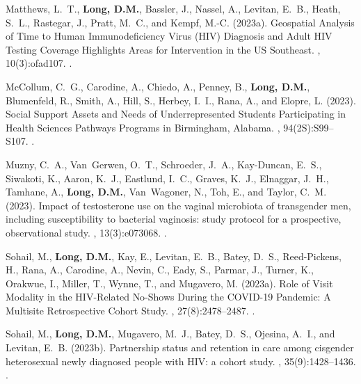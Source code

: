 \begin{thebibliography}{}
Matthews, L.~T., \textbf{Long, D.M.}, Bassler, J., Nassel, A., Levitan, E.~B., Heath,
  S.~L., Rastegar, J., Pratt, M.~C., and Kempf, M.-C. (2023a).
\newblock Geospatial {Analysis} of {Time} to {Human} {Immunodeficiency} {Virus}
  ({HIV}) {Diagnosis} and {Adult} {HIV} {Testing} {Coverage} {Highlights}
  {Areas} for {Intervention} in the {US} {Southeast}.
, 10(3):ofad107.
.  


McCollum, C.~G., Carodine, A., Chiedo, A., Penney, B., \textbf{Long, D.M.}, Blumenfeld,
  R., Smith, A., Hill, S., Herbey, I.~I., Rana, A., and Elopre, L. (2023).
\newblock Social {Support} {Assets} and {Needs} of {Underrepresented}
  {Students} {Participating} in {Health} {Sciences} {Pathways} {Programs} in
  {Birmingham}, {Alabama}.
,
  94(2S):S99--S107.
.  


Muzny, C.~A., Van~Gerwen, O.~T., Schroeder, J.~A., Kay-Duncan, E.~S., Siwakoti,
  K., Aaron, K.~J., Eastlund, I.~C., Graves, K.~J., Elnaggar, J.~H., Tamhane,
  A., \textbf{Long, D.M.}, Van~Wagoner, N., Toh, E., and Taylor, C.~M. (2023).
\newblock Impact of testosterone use on the vaginal microbiota of transgender
  men, including susceptibility to bacterial vaginosis: study protocol for a
  prospective, observational study.
, 13(3):e073068.
.  


Sohail, M., \textbf{Long, D.M.}, Kay, E., Levitan, E.~B., Batey, D.~S., Reed-Pickens, H.,
  Rana, A., Carodine, A., Nevin, C., Eady, S., Parmar, J., Turner, K., Orakwue,
  I., Miller, T., Wynne, T., and Mugavero, M. (2023a).
\newblock Role of {Visit} {Modality} in the {HIV}-{Related} {No}-{Shows}
  {During} the {COVID}-19 {Pandemic}: {A} {Multisite} {Retrospective} {Cohort}
  {Study}.
, 27(8):2478--2487.
.  


Sohail, M., \textbf{Long, D.M.}, Mugavero, M.~J., Batey, D.~S., Ojesina, A.~I., and
  Levitan, E.~B. (2023b).
\newblock Partnership status and retention in care among cisgender heterosexual
  newly diagnosed people with {HIV}: a cohort study.
, 35(9):1428--1436.
.  



\end{thebibliography}
